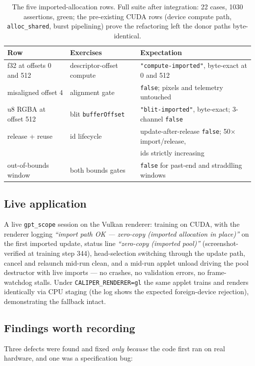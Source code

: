 \documentclass[11pt]{article}
\begin{document}
\begin{table}[ht]
\centering\footnotesize
\begin{tabular}{@{}lll@{}}
\toprule
Row & Exercises & Expectation \\
\midrule
f32 at offsets 0 and 512 & descriptor-offset compute &
  \texttt{"compute-imported"}, byte-exact at 0 and 512 \\
misaligned offset 4 & alignment gate &
  \texttt{false}; pixels and telemetry untouched \\
u8 RGBA at offset 512 & blit \texttt{bufferOffset} &
  \texttt{"blit-imported"}, byte-exact; 3-channel \texttt{false} \\
release + reuse & id lifecycle &
  update-after-release \texttt{false}; 50$\times$ import/release, \\
  & & ids strictly increasing \\
out-of-bounds window & both bounds gates &
  \texttt{false} for past-end and straddling windows \\
\bottomrule
\end{tabular}
\caption{The five imported-allocation rows. Full suite after integration:
22 cases, 1030 assertions, green; the pre-existing CUDA rows (device
compute path, \texttt{alloc\_shared}, burst pipelining) prove the
refactoring left the donor paths byte-identical.}
\label{tab:rows}
\end{table}

\subsection{Live application}
A live \texttt{gpt\_scope} session on the Vulkan renderer: training on CUDA,
with the renderer logging \emph{``import path OK --- zero-copy (imported
allocation in place)''} on the first imported update, status line
\emph{``zero-copy (imported pool)''} (screenshot-verified at training step
344), head-selection switching through the update path, cancel and relaunch
mid-run clean, and a mid-run applet unload driving the pool destructor with
live imports --- no crashes, no validation errors, no frame-watchdog stalls.
Under \texttt{CALIPER\_RENDERER=gl} the same applet trains and renders
identically via CPU staging (the log shows the expected foreign-device
rejection), demonstrating the fallback intact.

\subsection{Findings worth recording}
Three defects were found and fixed \emph{only because} the code first ran on
real hardware, and one was a specification bug:
\end{document}
